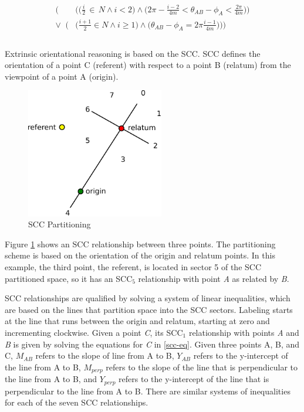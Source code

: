 \documentclass[12pt]{ucthesis}
\begin{document}
\begin{equation}\label{opra-eq}
\begin{aligned}
\Big(&\Big(\Big(\frac{i}{2} \, \in \, N \wedge i < 2\Big) \wedge \Big(2\pi - \frac{i-2}{4m} < \theta_{AB} - \phi_{A} < \frac{2\pi}{4m}\Big)\Big) \\
\lor \;\; \Big(&\Big(\frac{i+1}{2} \in N \wedge i \geq 1\Big) \wedge \Big(\theta_{AB} - \phi_{A} = 2\pi \frac{i-1}{4m}\Big)\Big)\Big) \\ \\
\end{aligned}
\end{equation}

Extrinsic orientational reasoning is based on the SCC. SCC defines the orientation of a point C (referent) with respect to a point B (relatum) from the viewpoint of a point A (origin).

\begin{figure}[H]
\centering
\includegraphics[width=60mm]{scc}
\caption{SCC Partitioning}
\label{scc}
\end{figure}

Figure \ref{scc} shows an SCC relationship between three points. The partitioning scheme is based on the orientation of the origin and relatum points. In this example, the third point, the referent, is located in sector 5 of the SCC partitioned space, so it has an SCC$_{5}$ relationship with point \emph{A} as related by \emph{B}. 

SCC relationships are qualified by solving a system of linear inequalities, which are based on the lines that partition space into the SCC sectors. Labeling starts at the line that runs between the origin and relatum, starting at zero and incrementing clockwise. Given a point \emph{C}, its SCC$_{1}$ relationship with points \emph{A} and \emph{B} is given by solving the equations for \emph{C} in \ref{scc-eq}. Given three points A, B, and C, $M_{AB}$ refers to the slope of line from A to B, $Y_{AB}$ refers to the y-intercept of the line from A to B, $M_{perp}$ refers to the slope of the line that is perpendicular to the line from A to B, and $Y_{perp}$ refers to the y-intercept of the line that is perpendicular to the line from A to B. There are similar systems of inequalities for each of the seven SCC relationships.  
\end{document}
